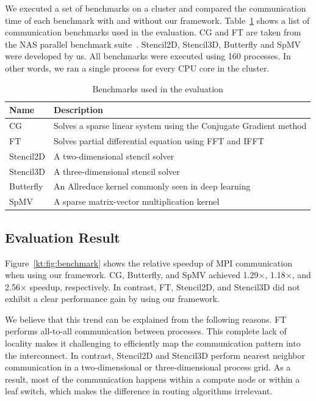 \documentclass[graybox]{svmult}
\begin{document}
We executed a set of benchmarks on a cluster and compared the communication
time of each benchmark with and without our framework.
Table~\ref{kt:tbl:miniapps} shows a list of communication benchmarks used in
the evaluation. CG and FT are taken from the NAS parallel benchmark
suite~\cite{Bailey1991}. Stencil2D, Stencil3D, Butterfly and SpMV were
developed by us. All benchmarks were executed using 160 processes. In other
words, we ran a single process for every CPU core in the cluster.

\begin{table}
\caption{Benchmarks used in the evaluation}%
\label{kt:tbl:miniapps}
\begin{tabular}{ll}
\toprule
Name      & Description \\ \midrule
CG        & Solves a sparse linear system using the Conjugate Gradient method \\
FT        & Solves partial differential equation using FFT and IFFT           \\
Stencil2D & A two-dimensional stencil solver                                  \\
Stencil3D & A three-dimensional stencil solver                                \\
Butterfly & An Allreduce kernel commonly seen in deep learning                \\
SpMV      & A sparse matrix-vector multiplication kernel                      \\ \bottomrule
\end{tabular}
\end{table}

\subsection{Evaluation Result}

Figure~\ref{kt:fig:benchmark} shows the relative speedup of MPI communication
when using our framework. CG, Butterfly, and SpMV achieved 1.29$\times$,
1.18$\times$, and 2.56$\times$ speedup, respectively. In contrast, FT,
Stencil2D, and Stencil3D did not exhibit a clear performance gain by using our
framework.

We believe that this trend can be explained from the following reasons. FT
performs all-to-all communication between processes. This complete lack of
locality makes it challenging to efficiently map the communication pattern
into the interconnect. In contrast, Stencil2D and Stencil3D perform nearest
neighbor communication in a two-dimensional or three-dimensional process grid.
As a result, most of the communication happens within a compute node or within
a leaf switch, which makes the difference in routing algorithms irrelevant.
\end{document}
